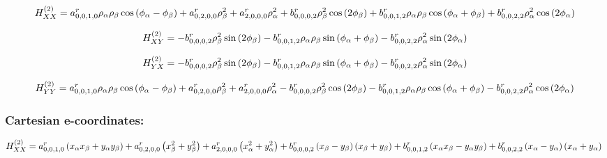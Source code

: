 \documentclass[fleqn]{article}
\begin{document}
\begin{dmath*}
H_{XX}^{(2)}=a^{r}_{0,0,1,0} \rho_{\alpha} \rho_{\beta} \cos{\left (\phi_{\alpha} - \phi_{\beta} \right )} + a^{r}_{0,2,0,0} \rho_{\beta}^{2} + a^{r}_{2,0,0,0} \rho_{\alpha}^{2} + b^{r}_{0,0,0,2} \rho_{\beta}^{2} \cos{\left (2 \phi_{\beta} \right )} + b^{r}_{0,0,1,2} \rho_{\alpha} \rho_{\beta} \cos{\left (\phi_{\alpha} + \phi_{\beta} \right )} + b^{r}_{0,0,2,2} \rho_{\alpha}^{2} \cos{\left (2 \phi_{\alpha} \right )}\\
\end{dmath*}

\begin{dmath*}
H_{XY}^{(2)}=-  b^{r}_{0,0,0,2} \rho_{\beta}^{2} \sin{\left (2 \phi_{\beta} \right )} -  b^{r}_{0,0,1,2} \rho_{\alpha} \rho_{\beta} \sin{\left (\phi_{\alpha} + \phi_{\beta} \right )} -  b^{r}_{0,0,2,2} \rho_{\alpha}^{2} \sin{\left (2 \phi_{\alpha} \right )}\\
\end{dmath*}

\begin{dmath*}
H_{YX}^{(2)}=-  b^{r}_{0,0,0,2} \rho_{\beta}^{2} \sin{\left (2 \phi_{\beta} \right )} -  b^{r}_{0,0,1,2} \rho_{\alpha} \rho_{\beta} \sin{\left (\phi_{\alpha} + \phi_{\beta} \right )} -  b^{r}_{0,0,2,2} \rho_{\alpha}^{2} \sin{\left (2 \phi_{\alpha} \right )}\\
\end{dmath*}

\begin{dmath*}
H_{YY}^{(2)}= a^{r}_{0,0,1,0} \rho_{\alpha} \rho_{\beta} \cos{\left (\phi_{\alpha} - \phi_{\beta} \right )} +  a^{r}_{0,2,0,0} \rho_{\beta}^{2} +  a^{r}_{2,0,0,0} \rho_{\alpha}^{2} -  b^{r}_{0,0,0,2} \rho_{\beta}^{2} \cos{\left (2 \phi_{\beta} \right )} -  b^{r}_{0,0,1,2} \rho_{\alpha} \rho_{\beta} \cos{\left (\phi_{\alpha} + \phi_{\beta} \right )} -  b^{r}_{0,0,2,2} \rho_{\alpha}^{2} \cos{\left (2 \phi_{\alpha} \right )}\\
\end{dmath*}
\subsubsection*{Cartesian e-coordinates:}

\begin{dmath*}
H_{XX}^{(2)}=a^{r}_{0,0,1,0} \left(x_{\alpha} x_{\beta} + y_{\alpha} y_{\beta}\right) + a^{r}_{0,2,0,0} \left(x_{\beta}^{2} + y_{\beta}^{2}\right) + a^{r}_{2,0,0,0} \left(x_{\alpha}^{2} + y_{\alpha}^{2}\right) + b^{r}_{0,0,0,2} \left(x_{\beta} - y_{\beta}\right) \left(x_{\beta} + y_{\beta}\right) + b^{r}_{0,0,1,2} \left(x_{\alpha} x_{\beta} - y_{\alpha} y_{\beta}\right) + b^{r}_{0,0,2,2} \left(x_{\alpha} - y_{\alpha}\right) \left(x_{\alpha} + y_{\alpha}\right)\\
\end{dmath*}
\end{document}
